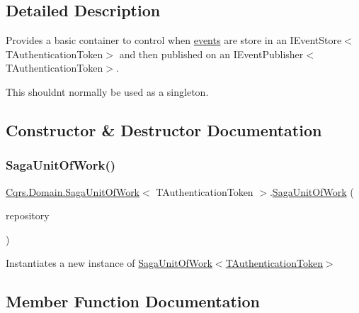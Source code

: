 \subsection{Detailed Description}
Provides a basic container to control when \hyperlink{}{events} are store in an I\+Event\+Store$<$\+T\+Authentication\+Token$>$ and then published on an I\+Event\+Publisher$<$\+T\+Authentication\+Token$>$. 

This shouldn\textquotesingle{}t normally be used as a singleton. 

\subsection{Constructor \& Destructor Documentation}
\mbox{\label{classCqrs_1_1Domain_1_1SagaUnitOfWork_ae2340d3bc97745c71d4854cb24115e93_ae2340d3bc97745c71d4854cb24115e93}} 
\subsubsection{\texorpdfstring{Saga\+Unit\+Of\+Work()}{SagaUnitOfWork()}}
{\footnotesize\ttfamily \hyperlink{classCqrs_1_1Domain_1_1SagaUnitOfWork}{Cqrs.\+Domain.\+Saga\+Unit\+Of\+Work}$<$ T\+Authentication\+Token $>$.\hyperlink{classCqrs_1_1Domain_1_1SagaUnitOfWork}{Saga\+Unit\+Of\+Work} (\begin{DoxyParamCaption}\item[{\hyperlink{interfaceCqrs_1_1Domain_1_1ISagaRepository}{I\+Saga\+Repository}$<$ T\+Authentication\+Token $>$}]{repository }\end{DoxyParamCaption})}



Instantiates a new instance of \hyperlink{classCqrs_1_1Domain_1_1SagaUnitOfWork_ae2340d3bc97745c71d4854cb24115e93_ae2340d3bc97745c71d4854cb24115e93}{Saga\+Unit\+Of\+Work$<$\+T\+Authentication\+Token$>$} 



\subsection{Member Function Documentation}
\mbox{\label{classCqrs_1_1Domain_1_1SagaUnitOfWork_af62fee98e76ec58ec4d684b36eb7b20e_af62fee98e76ec58ec4d684b36eb7b20e}} 
